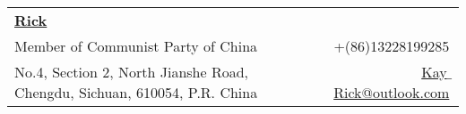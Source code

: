 \newcommand{\myheader}{
\begin{tabular*}{\textwidth}{l@{\extracolsep{\fill}}r}
  \textbf{\href{https://kay-rick.github.io/}{\LARGE Rick}}  \\
  Member of Communist Party of China$\,${\color{labelgrey}} & +(86)13228199285$\,${\color{labelgrey}} \\
  No.4, Section 2, North Jianshe Road, Chengdu, Sichuan, 610054, P.R. China$\,${\color{labelgrey}} & 
  \href{mailto:Kay_Rick@outlook.com}{Kay$\_$Rick@outlook.com}$\,${\color{labelgrey}} \\
 
  \end{tabular*}\\\vspace{0.1in}}

\myheader 

